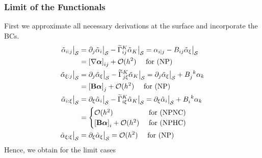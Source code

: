\documentclass[a4paper,10pt]{scrartcl}
\newcommand{\surf}{\mathcal{S}}
\newcommand{\landau}{\mathcal{O}}
\newcommand{\Bb}{\mathbf{B}}
\newcommand{\alphab}{\bm{\alpha}}
\newcommand{\talpha}{\tilde{\alpha}}
\newcommand{\tch}[2]{\widetilde{\Gamma}_{#1}^{#2}}
\begin{document}
    \subsubsection{Limit of the Functionals}
      First we approximate all necessary derivations at the surface and incorporate the BCs.
      \begin{align}
        \talpha_{i:j}\big|_{\surf} &= \partial_{j}\talpha_{i}\big|_{\surf} - \tch{ij}{K}\talpha_{K}\big|_{\surf}
                       = \alpha_{i|j} - B_{ij}\talpha_{\xi}\big|_{\surf}\\
                       &= \left[ \nabla\alphab \right]_{ij} + \landau(h^{2})\quad\text{ for (NP)} \\
        \talpha_{\xi :j}\big|_{\surf} &= \partial_{j}\talpha_{\xi}\big|_{\surf} - \tch{j\xi}{K}\talpha_{K}\big|_{\surf}
                                       = \partial_{j}\talpha_{\xi}\big|_{\surf} + \tensor{B}{_{j}^{k}}\alpha_{k}\\
                                      &= \left[ \Bb\alphab \right]_{j} + \landau(h^{2})\quad\text{ for (NP)}\\
        \talpha_{i :\xi}\big|_{\surf} &= \partial_{\xi}\talpha_{i}\big|_{\surf} - \tch{i\xi}{K}\talpha_{K}\big|_{\surf}
                                       =\partial_{\xi}\talpha_{i}\big|_{\surf} + \tensor{B}{_{i}^{k}}\alpha_{k}\\
                                      &=
                                          \begin{cases}
                                            \landau(h^{2}) & \text{ for (NPNC)} \\
                                            \left[ \Bb\alphab \right]_{i} + \landau(h^{2}) & \text{ for (NPHC)}
                                          \end{cases} \\
        \talpha_{\xi :\xi}\big|_{\surf} &= \partial_{\xi}\talpha_{\xi}\big|_{\surf} = \landau(h^{2})\quad\text{ for (NP)}
      \end{align}
      Hence, we obtain for the limit cases
\end{document}
